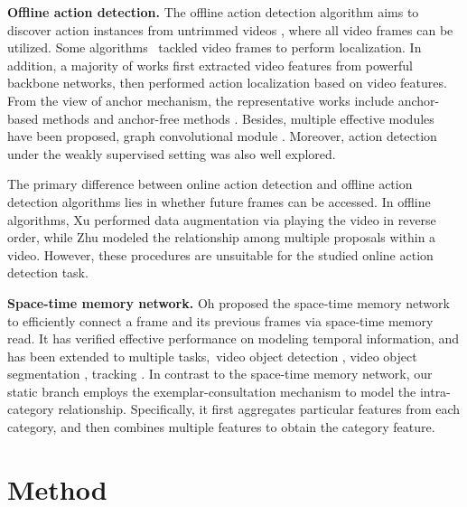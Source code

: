 \documentclass[10pt,twocolumn,letterpaper]{article}
\begin{document}
\noindent
\textbf{Offline action detection.}
The offline action detection algorithm aims to discover action instances from untrimmed videos \cite{chen2019relation, liu2021multi, liu2021end}, where all video frames can be utilized. Some algorithms~\cite{shou2016temporal, xu2017r, wang2021rgb, huang2021clrnet} tackled video frames to perform localization. In addition, a majority of works \cite{lin2017single, zhu2021enriching} first extracted video features from powerful backbone networks\cite{wang2016temporal, carreira2017quo, zhu2020label, zhu2021temporal}, then performed action localization based on video features. From the view of anchor mechanism, the representative works include anchor-based methods \cite{lin2017single, zhu2021enriching} and anchor-free methods \cite{lin2019bmn, yang2020revisiting, lin2021learning}. Besides, multiple effective modules have been proposed, \eg graph convolutional module \cite{zeng2019graph, zeng2021graph}. Moreover, action detection under the weakly supervised setting \cite{zeng2019breaking, yang2021background, zhao2021soda, yuan2019marginalized} was also well explored.

The primary difference between online action detection and offline action detection algorithms lies in whether future frames can be accessed. In offline algorithms, Xu \etal \cite{xu2017r} performed data augmentation via playing the video in reverse order, while Zhu \cite{zhu2021enriching} modeled the relationship among multiple proposals within a video. However, these procedures are unsuitable for the studied online action detection task. 

\noindent
\textbf{Space-time memory network.}
Oh \etal \cite{oh2019video} proposed the space-time memory network to efficiently connect a frame and its previous frames via space-time memory read. It has verified effective performance on modeling temporal information, and has been extended to multiple tasks,~\eg video object detection \cite{chen2020memory}, video object segmentation \cite{lu2020video, huang2021scribble}, tracking \cite{lai2020mast}. In contrast to the space-time memory network, our static branch employs the exemplar-consultation mechanism to model the intra-category relationship. Specifically, it first aggregates particular features from each category, and then combines multiple features to obtain the category feature.



\section{Method}
\end{document}
